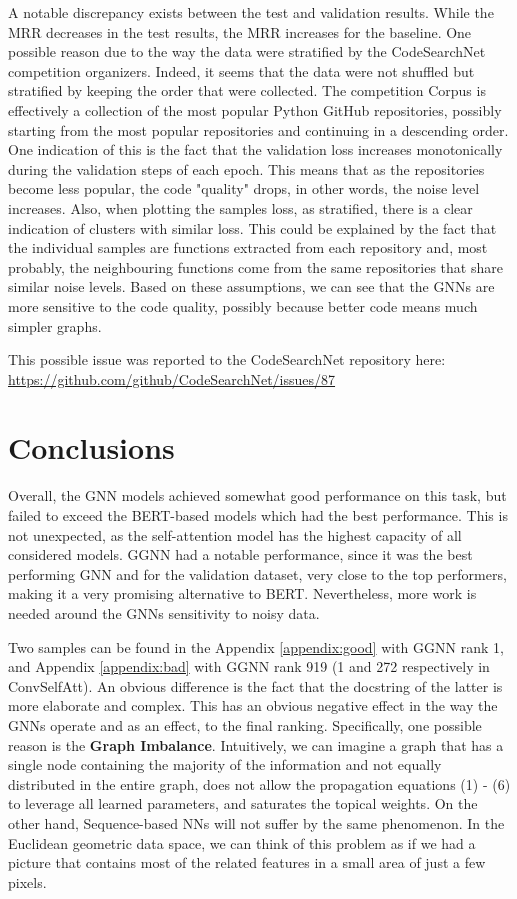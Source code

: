 \documentclass{article}
\begin{document}
A notable discrepancy exists between the test and validation results. While the MRR decreases in the test results, the MRR increases for the baseline. One possible reason due to the way the data were stratified by the CodeSearchNet competition organizers. Indeed, it seems that the data were not shuffled but stratified by keeping the order that were collected. The competition Corpus is effectively a collection of the most popular Python GitHub repositories, possibly starting from the most popular repositories and continuing in a descending order. One indication of this is the fact that the validation loss increases monotonically during the validation steps of each epoch. This means that as the repositories become less popular, the code "quality" drops, in other words, the noise level increases.
Also, when plotting the samples loss, as stratified, there is a clear indication of clusters with similar loss. This could be explained by the fact that the individual samples are functions extracted from each repository and, most probably, the neighbouring functions come from the same repositories that share similar noise levels.
Based on these assumptions, we can see that the GNNs are more sensitive to the code quality, possibly because better code means much simpler graphs.

This possible issue was reported to the CodeSearchNet repository here:  \url{https://github.com/github/CodeSearchNet/issues/87}

\section{Conclusions}
\label{ssec:conclusions}
Overall, the GNN models achieved somewhat good performance on this task, but failed to exceed the BERT-based models which had the best performance. This is not unexpected, as the self-attention model has the highest capacity of all considered models. GGNN had a notable performance, since it was the best performing GNN and for the validation dataset, very close to the top performers, making it a very promising alternative to BERT. Nevertheless, more work is needed around the GNNs sensitivity to noisy data.

Two samples can be found in the Appendix \autoref{appendix:good} with GGNN rank 1, and Appendix \autoref{appendix:bad} with GGNN rank 919 (1 and 272 respectively in ConvSelfAtt). An obvious difference is the fact that the docstring of the latter is more elaborate and complex. This has an obvious negative effect in the way the GNNs operate and as an effect, to the final ranking. Specifically, one possible reason is the \textbf{Graph Imbalance}. Intuitively, we can imagine a graph that has a single node containing the majority of the information and not equally distributed in the entire graph, does not allow the propagation equations (1) - (6) to leverage all learned parameters, and saturates the topical weights. On the other hand, Sequence-based NNs will not suffer by the same phenomenon. In the Euclidean geometric data space, we can think of this problem as if we had a picture that contains most of the related features in a small area of just a few pixels.
\end{document}
